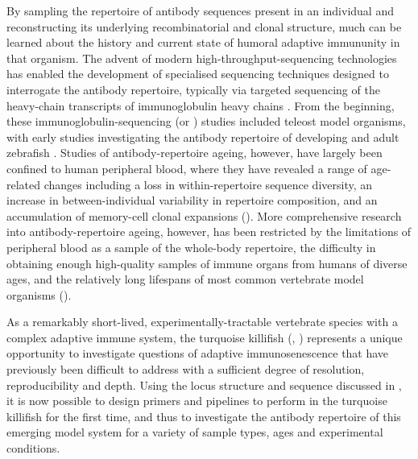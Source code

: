 By sampling the repertoire of antibody sequences present in an individual and reconstructing its underlying recombinatorial and clonal structure, much can be learned about the history and current state of humoral adaptive immununity in that organism.
The advent of modern high-throughput-sequencing technologies has enabled the development of specialised sequencing techniques designed to interrogate the antibody repertoire, typically via targeted sequencing of the heavy-chain transcripts of immunoglobulin heavy chains \parencite{vollmers2013consensus,turchaninova2016igprep}. From the beginning, these immunoglobulin-sequencing (or \igseq) studies included teleost model organisms, with early \igseq studies investigating the antibody repertoire of developing and adult zebrafish \parencite{weinstein2009igseq,jiang2011determinism}. Studies of antibody-repertoire ageing, however, have largely been confined to human peripheral blood, where they have revealed a range of age-related changes including a loss in within-repertoire sequence diversity, an increase in between-individual variability in repertoire composition, and an accumulation of memory-cell clonal expansions (). More comprehensive research into antibody-repertoire ageing, however, has been restricted by the limitations of peripheral blood as a sample of the whole-body repertoire, the difficulty in obtaining enough high-quality samples of immune organs from humans of diverse ages, and the relatively long lifespans of most common vertebrate model organisms (). 

As a remarkably short-lived, experimentally-tractable vertebrate species with a complex adaptive immune system, the turquoise killifish (\nfu, ) represents a unique opportunity to investigate questions of adaptive immunosenescence that have previously been difficult to address with a sufficient degree of resolution, reproducibility and depth. Using the \igh{} locus structure and sequence discussed in , it is now possible to design primers and pipelines to perform \igseq in the turquoise killifish for the first time, and thus to investigate the antibody repertoire of this emerging model system for a variety of sample types, ages and experimental conditions.


